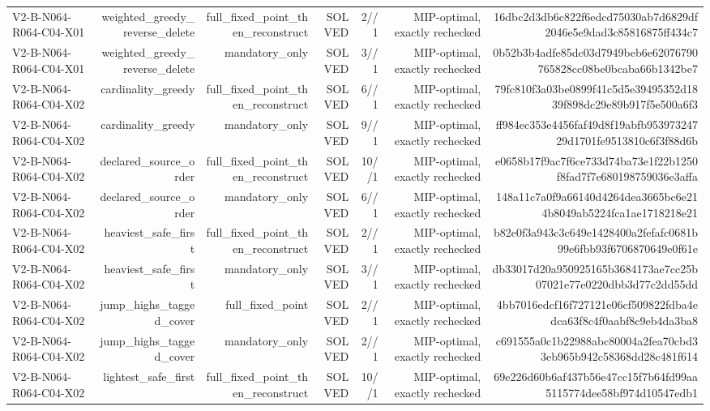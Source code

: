 {\begin{longtable}{lrrrrrr}
V2-B-N064-R064-C04-X01 & weighted\_greedy\_reverse\_delete & full\_fixed\_point\_then\_reconstruct & SOLVED & 2//1 & MIP-optimal, exactly rechecked & 16dbc2d3db6c822f6edcd75030ab7d6829df2046e5e9dad3c85816875ff434c7 \\
V2-B-N064-R064-C04-X01 & weighted\_greedy\_reverse\_delete & mandatory\_only & SOLVED & 3//1 & MIP-optimal, exactly rechecked & 0b52b3b4adfe85dc03d7949beb6e62076790765828cc08be0bcaba66b1342be7 \\
V2-B-N064-R064-C04-X02 & cardinality\_greedy & full\_fixed\_point\_then\_reconstruct & SOLVED & 6//1 & MIP-optimal, exactly rechecked & 79fc810f3a03be0899f41c5d5e39495352d1839f898dc29e89b917f5e500a6f3 \\
V2-B-N064-R064-C04-X02 & cardinality\_greedy & mandatory\_only & SOLVED & 9//1 & MIP-optimal, exactly rechecked & ff984ec353e4456faf49d8f19abfb95397324729d1701fe9513810c6f3f88d6b \\
V2-B-N064-R064-C04-X02 & declared\_source\_order & full\_fixed\_point\_then\_reconstruct & SOLVED & 10//1 & MIP-optimal, exactly rechecked & e0658b17f9ac7f6ce733d74ba73e1f22b1250f8fad7f7e680198759036e3affa \\
V2-B-N064-R064-C04-X02 & declared\_source\_order & mandatory\_only & SOLVED & 6//1 & MIP-optimal, exactly rechecked & 148a11c7a0f9a66140d4264dea3665bc6e214b8049ab5224fca1ae1718218e21 \\
V2-B-N064-R064-C04-X02 & heaviest\_safe\_first & full\_fixed\_point\_then\_reconstruct & SOLVED & 2//1 & MIP-optimal, exactly rechecked & b82e0f3a943c3c649e1428400a2fefafc0681b99e6fbb93f6706870649e0f61e \\
V2-B-N064-R064-C04-X02 & heaviest\_safe\_first & mandatory\_only & SOLVED & 3//1 & MIP-optimal, exactly rechecked & db33017d20a950925165b3684173ae7cc25b07021e77e0220dbb3d77c2dd55dd \\
V2-B-N064-R064-C04-X02 & jump\_highs\_tagged\_cover & full\_fixed\_point & SOLVED & 2//1 & MIP-optimal, exactly rechecked & 4bb7016edcf16f727121e06cf509822fdba4edca63f8c4f0aabf8c9eb4da3ba8 \\
V2-B-N064-R064-C04-X02 & jump\_highs\_tagged\_cover & mandatory\_only & SOLVED & 2//1 & MIP-optimal, exactly rechecked & c691555a0c1b22988abc80004a2fea70cbd33eb965b942c58368dd28c481f614 \\
V2-B-N064-R064-C04-X02 & lightest\_safe\_first & full\_fixed\_point\_then\_reconstruct & SOLVED & 10//1 & MIP-optimal, exactly rechecked & 69e226d60b6af437b56e47cc15f7b64fd99aa5115774dee58bf974d10547edb1 \\

\end{longtable}}
